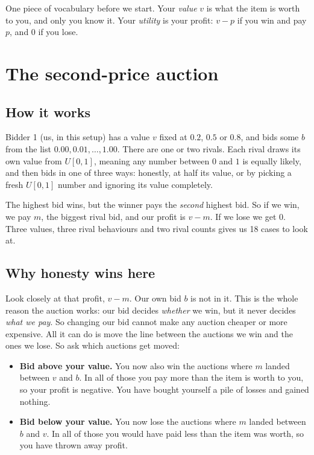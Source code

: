 \documentclass[10pt,a4paper]{article}
\begin{document}
One piece of vocabulary before we start. Your \emph{value} $v$ is what the item is worth to
you, and only you know it. Your \emph{utility} is your profit: $v - p$ if you win and pay
$p$, and $0$ if you lose.

\section{The second-price auction}
\label{sec:second}

\subsection{How it works}

Bidder 1 (us, in this setup) has a value $v$ fixed at $0.2$, $0.5$ or $0.8$, and bids some
$b$ from the list $0.00, 0.01, \dots, 1.00$. There are one or two rivals. Each rival draws
its own value from $U[0,1]$, meaning any number between $0$ and $1$ is equally likely, and
then bids in one of three ways: honestly, at half its value, or by picking a fresh $U[0,1]$
number and ignoring its value completely.

The highest bid wins, but the winner pays the \emph{second} highest bid. So if we win, we
pay $m$, the biggest rival bid, and our profit is $v - m$. If we lose we get $0$. Three
values, three rival behaviours and two rival counts gives us 18 cases to look at.

\subsection{Why honesty wins here}

Look closely at that profit, $v - m$. Our own bid $b$ is not in it. This is the whole
reason the auction works: our bid decides \emph{whether} we win, but it never decides
\emph{what we pay}. So changing our bid cannot make any auction cheaper or more expensive.
All it can do is move the line between the auctions we win and the ones we lose. So ask
which auctions get moved:

\begin{itemize}
\itemsep0.15em
\item \textbf{Bid above your value.} You now also win the auctions where $m$ landed between
$v$ and $b$. In all of those you pay more than the item is worth to you, so your profit is
negative. You have bought yourself a pile of losses and gained nothing.
\item \textbf{Bid below your value.} You now lose the auctions where $m$ landed between $b$
and $v$. In all of those you would have paid less than the item was worth, so you have
thrown away profit.
\end{itemize}
\end{document}
